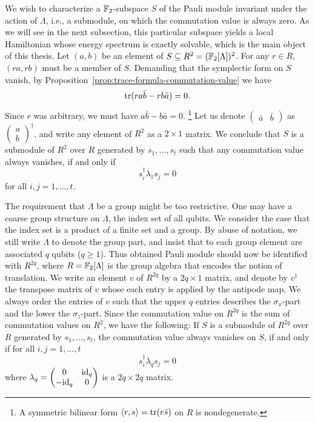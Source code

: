 We wish to characterize a $\mathbb{F}_2$-subspace $S$ of the Pauli module
invariant under the action of $\Lambda$, i.e., a submodule,
on which the commutation value is always zero.
As we will see in the next subsection,
this particular subspace yields a local Hamiltonian whose energy spectrum is exactly solvable,
which is the main object of this thesis.
%
Let $(a,b)$ be an element of $S \subseteq R^2 = (\mathbb{F}_2[\Lambda])^2$.
For any $r \in R$, $(ra, rb)$ must be a member of $S$.
Demanding that the symplectic form on $S$ vanish,
by Proposition~\ref{prop:trace-formula-commutation-value} we have
\[
 \mathop{\mathrm{tr}}\nolimits (ra \bar b - rb \bar a) = 0 .
\]
Since $r$ was arbitrary, we must have $a \bar b - b \bar a = 0$.%
%
\footnote{{A symmetric bilinear form $ \langle r, s \rangle = \mathop{\mathrm{tr}}\nolimits(r \bar{s}) $ on $R$ is nondegenerate.}}
%
Let us denote $\begin{pmatrix}\bar a & \bar b \end{pmatrix}$ 
as $\begin{pmatrix} a \\ b \end{pmatrix}^\dagger$,
and write any element of $R^2$ as a $2 \times 1$ matrix.
We conclude that $S$ is a submodule of $R^2$ over $R$ generated by $s_1, \ldots, s_t$
such that any commutation value always vanishes, if and only if
\[
 s_i^\dagger \lambda_1 s_j = 0
\]
for all $i,j = 1,\ldots,t$.

The requirement that $\Lambda$ be a group might be too restrictive.
One may have a coarse group structure on $\Lambda$, the index set of all qubits.
We consider the case that the index set is a product of a finite set and a group.
By abuse of notation, we still write $\Lambda$ to denote the group part,
and insist that to each group element are associated $q$ qubits ($q \ge 1$).
Thus obtained Pauli module should now be identified with $R^{2q}$,
where $R = \mathbb{F}_2[\Lambda]$ is the group algebra
that encodes the notion of translation.
We write an element $v$ of $R^{2q}$ by a $2q \times 1$ matrix,
and denote by $v^\dagger$ the transpose matrix of $v$ whose each entry is applied by the antipode map.
We always order the entries of $v$ such that the upper $q$ entries
describes the $\sigma_x$-part and the lower the $\sigma_z$-part.
Since the commutation value on $R^{2q}$ is the sum of commutation values on $R^2$,
we have the following:
If $S$ is a submodule of $R^{2q}$ over $R$ generated by $s_1, \ldots, s_t$,
the commutation value always vanishes on $S$, if and only if for all $i,j = 1, \ldots, t$
\[
 s_i^\dagger \lambda_q s_j = 0
\]
where $\lambda_q = \begin{pmatrix} 0 & \mathrm{id}_q \\ -\mathrm{id}_q & 0 \end{pmatrix}$ is a $2q \times 2q$ matrix.


